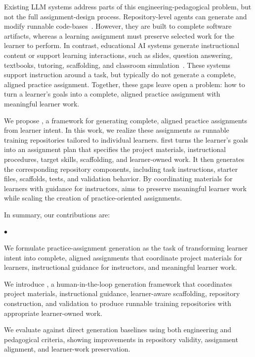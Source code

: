 Existing LLM systems address parts of this engineering-pedagogical problem, but not the full assignment-design process.
Repository-level agents can generate and modify runnable code-bases~\cite{qian2023chatdev,hong2023metagpt,yang2024sweagent,wang2024openhands,zhang2024codeagent,shi2025autop2c}.
However, they are built to complete software artifacts, whereas a learning assignment must preserve selected work for the learner to perform.
In contrast, educational AI systems generate instructional content or support learning interactions, such as slides, question answering, textbooks, tutoring, scaffolding, and classroom simulation~\cite{zheng2025pptagent,zheng2026deeppresenter,shao2024storm,sharma2025pustakai,wang2024lessonplanner,zhang2024simclass,jang2026medtutor,cohn2026edf,deriyeva2026script,gao2024sinkt}.
These systems support instruction around a task, but typically do not generate a complete, aligned practice assignment.
Together, these gaps leave open a problem: how to turn a learner's goals into a complete, aligned practice assignment with meaningful learner work.


We propose \model, a framework for generating complete, aligned practice assignments from learner intent.
In this work, we realize these assignments as runnable training repositories tailored to individual learners.
\model first turns the learner's goals into an assignment plan that specifies the project materials, instructional procedures, target skills, scaffolding, and learner-owned work.
It then generates the corresponding repository components, including task instructions, starter files, scaffolds, tests, and validation behavior.
By coordinating materials for learners with guidance for instructors, \model aims to preserve meaningful learner work while scaling the creation of practice-oriented assignments.



\smallskip
\noindent In summary, our contributions are:
\begin{list}{$\bullet$}{%
    \setlength{\leftmargin}{1em}
    \setlength{\labelwidth}{0.5em}
    \setlength{\labelsep}{0.3em}
    \setlength{\itemsep}{0.2em}
    \setlength{\topsep}{0.2em}
    \setlength{\parsep}{0pt}
}
    \item We formulate practice-assignment generation as the task of transforming learner intent into complete, aligned assignments that coordinate project materials for learners, instructional guidance for instructors, and meaningful learner work.
    \item We introduce \model, a human-in-the-loop generation framework that coordinates project materials, instructional guidance, learner-aware scaffolding, repository construction, and validation to produce runnable training repositories with appropriate learner-owned work.
    \item We evaluate \model against direct generation baselines using both engineering and pedagogical criteria, showing improvements in repository validity, assignment alignment, and learner-work preservation.
\end{list}
